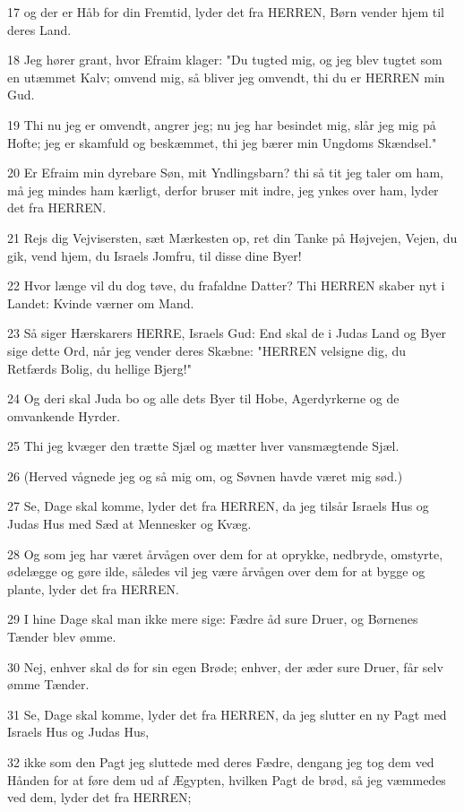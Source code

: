 \par 17 og der er Håb for din Fremtid, lyder det fra HERREN, Børn vender hjem til deres Land.
\par 18 Jeg hører grant, hvor Efraim klager: "Du tugted mig, og jeg blev tugtet som en utæmmet Kalv; omvend mig, så bliver jeg omvendt, thi du er HERREN min Gud.
\par 19 Thi nu jeg er omvendt, angrer jeg; nu jeg har besindet mig, slår jeg mig på Hofte; jeg er skamfuld og beskæmmet, thi jeg bærer min Ungdoms Skændsel."
\par 20 Er Efraim min dyrebare Søn, mit Yndlingsbarn? thi så tit jeg taler om ham, må jeg mindes ham kærligt, derfor bruser mit indre, jeg ynkes over ham, lyder det fra HERREN.
\par 21 Rejs dig Vejvisersten, sæt Mærkesten op, ret din Tanke på Højvejen, Vejen, du gik, vend hjem, du Israels Jomfru, til disse dine Byer!
\par 22 Hvor længe vil du dog tøve, du frafaldne Datter? Thi HERREN skaber nyt i Landet: Kvinde værner om Mand.
\par 23 Så siger Hærskarers HERRE, Israels Gud: End skal de i Judas Land og Byer sige dette Ord, når jeg vender deres Skæbne: "HERREN velsigne dig, du Retfærds Bolig, du hellige Bjerg!"
\par 24 Og deri skal Juda bo og alle dets Byer til Hobe, Agerdyrkerne og de omvankende Hyrder.
\par 25 Thi jeg kvæger den trætte Sjæl og mætter hver vansmægtende Sjæl.
\par 26 (Herved vågnede jeg og så mig om, og Søvnen havde været mig sød.)
\par 27 Se, Dage skal komme, lyder det fra HERREN, da jeg tilsår Israels Hus og Judas Hus med Sæd at Mennesker og Kvæg.
\par 28 Og som jeg har været årvågen over dem for at oprykke, nedbryde, omstyrte, ødelægge og gøre ilde, således vil jeg være årvågen over dem for at bygge og plante, lyder det fra HERREN.
\par 29 I hine Dage skal man ikke mere sige: Fædre åd sure Druer, og Børnenes Tænder blev ømme.
\par 30 Nej, enhver skal dø for sin egen Brøde; enhver, der æder sure Druer, får selv ømme Tænder.
\par 31 Se, Dage skal komme, lyder det fra HERREN, da jeg slutter en ny Pagt med Israels Hus og Judas Hus,
\par 32 ikke som den Pagt jeg sluttede med deres Fædre, dengang jeg tog dem ved Hånden for at føre dem ud af Ægypten, hvilken Pagt de brød, så jeg væmmedes ved dem, lyder det fra HERREN;
